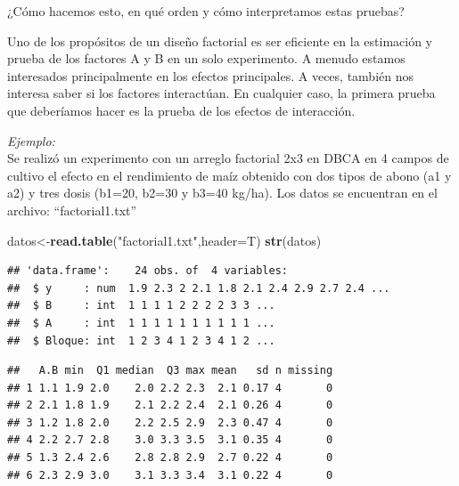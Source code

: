 \documentclass[]{book}
\newenvironment{Shaded}{\begin{snugshade}}{\end{snugshade}}
\newcommand{\KeywordTok}[1]{\textcolor[rgb]{0.13,0.29,0.53}{\textbf{#1}}}
\newcommand{\DataTypeTok}[1]{\textcolor[rgb]{0.13,0.29,0.53}{#1}}
\newcommand{\StringTok}[1]{\textcolor[rgb]{0.31,0.60,0.02}{#1}}
\newcommand{\OperatorTok}[1]{\textcolor[rgb]{0.81,0.36,0.00}{\textbf{#1}}}
\newcommand{\NormalTok}[1]{#1}
\begin{document}
¿Cómo hacemos esto, en qué orden y cómo interpretamos estas pruebas?

Uno de los propósitos de un diseño factorial es ser eficiente en la
estimación y prueba de los factores A y B en un solo experimento. A
menudo estamos interesados principalmente en los efectos principales. A
veces, también nos interesa saber si los factores interactúan. En
cualquier caso, la primera prueba que deberíamos hacer es la prueba de
los efectos de interacción.

\emph{Ejemplo:}\\
Se realizó un experimento con un arreglo factorial 2x3 en DBCA en 4
campos de cultivo el efecto en el rendimiento de maíz obtenido con dos
tipos de abono (a1 y a2) y tres dosis (b1=20, b2=30 y b3=40 kg/ha). Los
datos se encuentran en el archivo: ``factorial1.txt''

\begin{Shaded}
\begin{Highlighting}[]
\NormalTok{datos<-}\KeywordTok{read.table}\NormalTok{(}\StringTok{"factorial1.txt"}\NormalTok{,}\DataTypeTok{header=}\NormalTok{T)}
\KeywordTok{str}\NormalTok{(datos)}
\end{Highlighting}
\end{Shaded}

\begin{verbatim}
## 'data.frame':    24 obs. of  4 variables:
##  $ y     : num  1.9 2.3 2 2.1 1.8 2.1 2.4 2.9 2.7 2.4 ...
##  $ B     : int  1 1 1 1 2 2 2 2 3 3 ...
##  $ A     : int  1 1 1 1 1 1 1 1 1 1 ...
##  $ Bloque: int  1 2 3 4 1 2 3 4 1 2 ...
\end{verbatim}

\begin{Shaded}
\end{Shaded}

\begin{verbatim}
##   A.B min  Q1 median  Q3 max mean   sd n missing
## 1 1.1 1.9 2.0    2.0 2.2 2.3  2.1 0.17 4       0
## 2 2.1 1.8 1.9    2.1 2.2 2.4  2.1 0.26 4       0
## 3 1.2 1.8 2.0    2.2 2.5 2.9  2.3 0.47 4       0
## 4 2.2 2.7 2.8    3.0 3.3 3.5  3.1 0.35 4       0
## 5 1.3 2.4 2.6    2.8 2.8 2.9  2.7 0.22 4       0
## 6 2.3 2.9 3.0    3.1 3.3 3.4  3.1 0.22 4       0
\end{verbatim}
\end{document}
